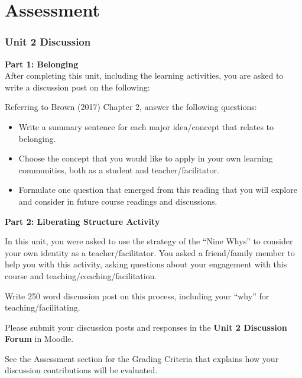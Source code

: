 \documentclass[
]{book}
\begin{document}
\hypertarget{assessment-1}{%
\section*{Assessment}\label{assessment-1}}

\begin{assessment}
\hypertarget{unit-2-discussion}{%
\subsubsection*{Unit 2 Discussion}\label{unit-2-discussion}}

\textbf{Part 1: Belonging}\\
After completing this unit, including the learning activities, you are
asked to write a discussion post on the following:

Referring to Brown (2017) Chapter 2, answer the following questions:

\begin{itemize}
\item
  Write a summary sentence for each major idea/concept that relates to
  belonging.
\item
  Choose the concept that you would like to apply in your own learning
  communities, both as a student and teacher/facilitator.
\item
  Formulate one question that emerged from this reading that you will
  explore and consider in future course readings and discussions.
\end{itemize}

\textbf{Part 2: Liberating Structure Activity}

In this unit, you were asked to use the strategy of the ``Nine Whys'' to
consider your own identity as a teacher/facilitator. You asked a
friend/family member to help you with this activity, asking questions
about your engagement with this course and
teaching/coaching/facilitation.

Write 250 word discussion post on this process, including your ``why''
for teaching/facilitating.

Please submit your discussion posts and responses in the \textbf{Unit 2
Discussion Forum} in Moodle.

See the Assessment section for the Grading Criteria that explains how
your discussion contributions will be evaluated.
\end{assessment}
\end{document}
